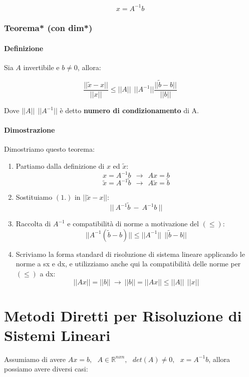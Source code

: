 \documentclass{article}
\begin{document}
\[ x = A^{-1}b \]

\subsubsection{Teorema* (con dim*)} 

\paragraph{Definizione} Sia $A$ invertibile e $b \neq 0$, allora:

\[ \frac{||\tilde{x}-x||}{||x||} \leq ||A||\:\:||A^{-1}|| \frac{||\tilde{b}-b||}{||b||} \]

Dove $||A||\:\:||A^{-1}||$ è detto \textbf{numero di condizionamento} di A.

\newpage

\paragraph{Dimostrazione} Dimostriamo questo teorema:

\begin{enumerate}
    \item Partiamo dalla definizione di $x$ ed $\tilde{x}$:
    \[ x = A^{-1}b \: \:\rightarrow \: \: Ax = b\]
    \[ \tilde{x} = A^{-1}\tilde{b} \: \:\rightarrow \: \: A\tilde{x} = \tilde{b}\]
    \item Sostituiamo $(1.)$ in $||\tilde{x}-x||$:
    \[ || \: A^{-1}\tilde{b} \: - \: A^{-1}{b} \: || \]
    \item Raccolta di $A^{-1}$ e compatibilità di norme a motivazione del $(\leq)$:
    \[ ||A^{-1}(\tilde{b}-b)|| \leq ||A^{-1}|| \: \: ||\tilde{b}-b|| \]
    \item Scriviamo la forma standard di risoluzione di sistema lineare applicando le norme a sx e dx, e utilizziamo anche qui la compatibilità delle norme per $(\leq)$ a dx:
    \[ ||Ax|| = ||b|| \: \rightarrow \: ||b|| = ||Ax|| \leq ||A|| \: \: ||x|| \]
\end{enumerate}

\newpage

\section{Metodi Diretti per Risoluzione di Sistemi Lineari}

Assumiamo di avere $Ax = b, \: \: \: A\in \mathbb{R}^{nxn}, \: \: \: det(A)\neq0, \: \: \: x = A^{-1}b$, allora possiamo avere diversi casi:
\end{document}
